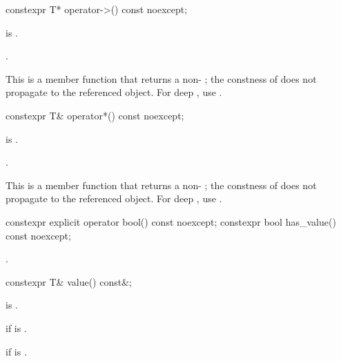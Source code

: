 %
\begin{itemdecl}
constexpr T* operator->() const noexcept;
\end{itemdecl}

\begin{itemdescr}
\pnum
\expects
{} is .

\pnum
\returns
{}.

\pnum
\remarks
This is a  member function that returns a non- ; the constness of  does not propagate to the referenced object. For deep , use .
\end{itemdescr}

%
\begin{itemdecl}
constexpr T& operator*() const noexcept;
\end{itemdecl}

\begin{itemdescr}
\pnum
\expects
{} is .

\pnum
\returns
{}.

\pnum
\remarks
This is a  member function that returns a non- ; the constness of  does not propagate to the referenced object. For deep , use .
\end{itemdescr}

%
%
\begin{itemdecl}
constexpr explicit operator bool() const noexcept;
constexpr bool has_value() const noexcept;
\end{itemdecl}

\begin{itemdescr}
\pnum
\returns
{}.
\end{itemdescr}

%
\begin{itemdecl}
constexpr T& value() const&;
\end{itemdecl}

\begin{itemdescr}
\pnum
\mandates
{} is .

\pnum
\returns
{} if  is .

\pnum
\throws
{} if  is .
\end{itemdescr}

